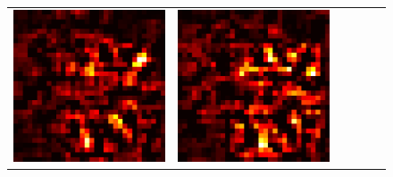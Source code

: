 \documentclass[preprint,12pt]{elsarticle}
\begin{document}
\begin{figure}[p]
\begin{tabular}{cccccc}
  \includegraphics[scale=\scale]{../visualizations/examples/cifar10/cnn/positive_saliency_map/1.png} & 
  \includegraphics[scale=\scale]{../visualizations/examples/cifar10/cnn/negative_saliency_map/1.png} & 

\end{tabular}
\end{figure}
\end{document}
